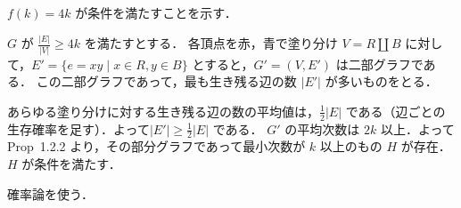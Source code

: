 \subsection{}
$f(k) = 4k$ が条件を満たすことを示す．

$G$ が $\frac{|E|}{|V|} \geq 4k$ を満たすとする．
各頂点を赤，青で塗り分け $V = R\amalg B$ に対して，$E' = \{e = xy\mid x\in R, y\in B\}$ とすると，$G' = (V, E')$ は二部グラフである．
この二部グラフであって，最も生き残る辺の数 $|E'|$ が多いものをとる．

あらゆる塗り分けに対する生き残る辺の数の平均値は，$\frac12 |E|$ である（辺ごとの生存確率を足す）．よって$|E'| \geq \frac12 |E|$ である．
$G'$ の平均次数は $2k$ 以上．よって Prop~1.2.2 より，その部分グラフであって最小次数が $k$ 以上のもの $H$ が存在．$H$ が条件を満たす．

 
確率論を使う．